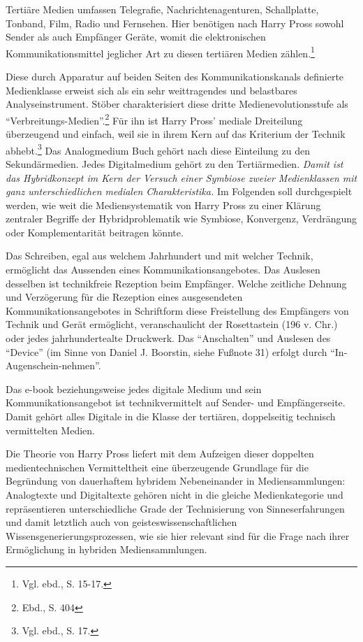 \documentclass[a4paper,
fontsize=11pt,
oneside,
numbers=noperiodatend,
parskip=half-,
bibliography=totoc,
final
]{scrartcl}
\begin{document}
Tertiäre Medien umfassen Telegrafie, Nachrichtenagenturen, Schallplatte,
Tonband, Film, Radio und Fernsehen. Hier benötigen nach Harry Pross
sowohl Sender als auch Empfänger Geräte, womit die elektronischen
Kommunikationsmittel jeglicher Art zu diesen tertiären Medien
zählen.\footnote{Vgl. ebd., S. 15-17.}

Diese durch Apparatur auf beiden Seiten des Kommunikationskanals
definierte Medienklasse erweist sich als ein sehr weittragendes und
belastbares Analyseinstrument. Stöber charakterisiert diese dritte
Medienevolutionsstufe als \enquote{Verbreitungs-Medien}.\footnote{Ebd.,
  S. 404} Für ihn ist Harry Pross' mediale Dreiteilung überzeugend und
einfach, weil sie in ihrem Kern auf das Kriterium der Technik
abhebt.\footnote{Vgl. ebd., S. 17.} Das Analogmedium Buch gehört nach
diese Einteilung zu den Sekundärmedien. Jedes Digitalmedium gehört zu
den Tertiärmedien. \emph{Damit ist das Hybridkonzept im Kern der Versuch
einer Symbiose zweier Medienklassen mit ganz unterschiedlichen medialen
Charakteristika.} Im Folgenden soll durchgespielt werden, wie weit die
Mediensystematik von Harry Pross zu einer Klärung zentraler Begriffe der
Hybridproblematik wie Symbiose, Konvergenz, Verdrängung oder
Komplementarität beitragen könnte.

Das Schreiben, egal aus welchem Jahrhundert und mit welcher Technik,
ermöglicht das Aussenden eines Kommunikationsangebotes. Das Auslesen
desselben ist technikfreie Rezeption beim Empfänger. Welche zeitliche
Dehnung und Verzögerung für die Rezeption eines ausgesendeten
Kommunikationsangebotes in Schriftform diese Freistellung des Empfängers
von Technik und Gerät ermöglicht, veranschaulicht der Rosettastein (196
v. Chr.) oder jedes jahrhundertealte Druckwerk. Das \enquote{Anschalten}
und Auslesen des \enquote{Device} (im Sinne von Daniel J. Boorstin,
siehe Fußnote 31) erfolgt durch \enquote{In-Augenschein-nehmen}.

Das e-book beziehungsweise jedes digitale Medium und sein
Kommunikationsangebot ist technikvermittelt auf Sender- und
Empfängerseite. Damit gehört alles Digitale in die Klasse der tertiären,
doppelseitig technisch vermittelten Medien.

Die Theorie von Harry Pross liefert mit dem Aufzeigen dieser doppelten
medientechnischen Vermitteltheit eine überzeugende Grundlage für die
Begründung von dauerhaftem hybridem Nebeneinander in Mediensammlungen:
Analogtexte und Digitaltexte gehören nicht in die gleiche
Medienkategorie und repräsentieren unterschiedliche Grade der
Technisierung von Sinneserfahrungen und damit letztlich auch von
geisteswissenschaftlichen Wissensgenerierungsprozessen, wie sie hier
relevant sind für die Frage nach ihrer Ermöglichung in hybriden
Mediensammlungen.
\end{document}
